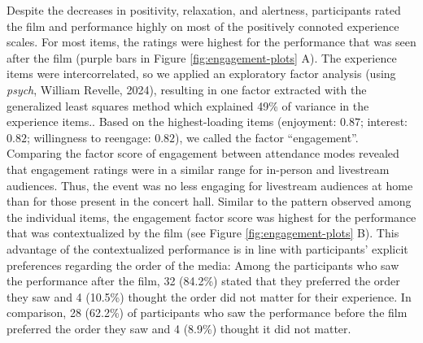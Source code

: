 \documentclass[
  man,floatsintext]{apa6}
\begin{document}
Despite the decreases in positivity, relaxation, and alertness, participants rated the film and performance highly on most of the positively connoted experience scales. For most items, the ratings were highest for the performance that was seen after the film (purple bars in Figure \ref{fig:engagement-plots} A). The experience items were intercorrelated, so we applied an exploratory factor analysis (using \emph{psych}, William Revelle, 2024), resulting in one factor extracted with the generalized least squares method which explained 49\% of variance in the experience items.. Based on the highest-loading items (enjoyment: \(0.87\); interest: \(0.82\); willingness to reengage: \(0.82\)), we called the factor ``engagement''. Comparing the factor score of engagement between attendance modes revealed that engagement ratings were in a similar range for in-person and livestream audiences. Thus, the event was no less engaging for livestream audiences at home than for those present in the concert hall. Similar to the pattern observed among the individual items, the engagement factor score was highest for the performance that was contextualized by the film (see Figure \ref{fig:engagement-plots} B). This advantage of the contextualized performance is in line with participants' explicit preferences regarding the order of the media: Among the participants who saw the performance after the film, 32 (84.2\%) stated that they preferred the order they saw and 4 (10.5\%) thought the order did not matter for their experience. In comparison, 28 (62.2\%) of participants who saw the performance before the film preferred the order they saw and 4 (8.9\%) thought it did not matter.
\end{document}
